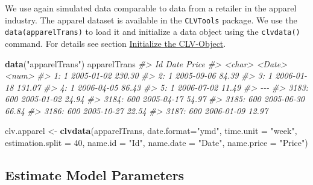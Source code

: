 \documentclass[
]{article}
\newenvironment{Shaded}{\begin{snugshade}}{\end{snugshade}}
\newcommand{\AttributeTok}[1]{\textcolor[rgb]{0.13,0.29,0.53}{#1}}
\newcommand{\CommentTok}[1]{\textcolor[rgb]{0.56,0.35,0.01}{\textit{#1}}}
\newcommand{\DecValTok}[1]{\textcolor[rgb]{0.00,0.00,0.81}{#1}}
\newcommand{\FunctionTok}[1]{\textcolor[rgb]{0.13,0.29,0.53}{\textbf{#1}}}
\newcommand{\NormalTok}[1]{#1}
\newcommand{\OtherTok}[1]{\textcolor[rgb]{0.56,0.35,0.01}{#1}}
\newcommand{\StringTok}[1]{\textcolor[rgb]{0.31,0.60,0.02}{#1}}
\begin{document}
We use again simulated data comparable to data from a retailer in the
apparel industry. The apparel dataset is available in the
\texttt{CLVTools} package. We use the \texttt{data(apparelTrans)} to
load it and initialize a data object using the \texttt{clvdata()}
command. For details see section \hyperref[clvdata]{Initialize the
CLV-Object}.

\begin{Shaded}
\begin{Highlighting}[]
\FunctionTok{data}\NormalTok{(}\StringTok{"apparelTrans"}\NormalTok{)}
\NormalTok{apparelTrans}
\CommentTok{\#\textgreater{}           Id       Date  Price}
\CommentTok{\#\textgreater{}       \textless{}char\textgreater{}     \textless{}Date\textgreater{}  \textless{}num\textgreater{}}
\CommentTok{\#\textgreater{}    1:      1 2005{-}01{-}02 230.30}
\CommentTok{\#\textgreater{}    2:      1 2005{-}09{-}06  84.39}
\CommentTok{\#\textgreater{}    3:      1 2006{-}01{-}18 131.07}
\CommentTok{\#\textgreater{}    4:      1 2006{-}04{-}05  86.43}
\CommentTok{\#\textgreater{}    5:      1 2006{-}07{-}02  11.49}
\CommentTok{\#\textgreater{}   {-}{-}{-}                         }
\CommentTok{\#\textgreater{} 3183:    600 2005{-}01{-}02  24.94}
\CommentTok{\#\textgreater{} 3184:    600 2005{-}04{-}17  54.97}
\CommentTok{\#\textgreater{} 3185:    600 2005{-}06{-}30  66.84}
\CommentTok{\#\textgreater{} 3186:    600 2005{-}10{-}27  22.54}
\CommentTok{\#\textgreater{} 3187:    600 2006{-}01{-}09  12.97}

\NormalTok{clv.apparel }\OtherTok{\textless{}{-}} \FunctionTok{clvdata}\NormalTok{(apparelTrans,  }
                       \AttributeTok{date.format=}\StringTok{"ymd"}\NormalTok{, }
                       \AttributeTok{time.unit =} \StringTok{"week"}\NormalTok{,}
                       \AttributeTok{estimation.split =} \DecValTok{40}\NormalTok{,}
                       \AttributeTok{name.id =} \StringTok{"Id"}\NormalTok{,}
                       \AttributeTok{name.date =} \StringTok{"Date"}\NormalTok{,}
                       \AttributeTok{name.price =} \StringTok{"Price"}\NormalTok{)}
\end{Highlighting}
\end{Shaded}

\subsection{Estimate Model Parameters}\label{estimate-model-parameters}
\end{document}
